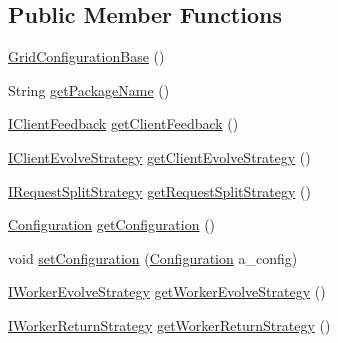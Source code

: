 \subsection*{Public Member Functions}
\begin{DoxyCompactItemize}
\item 
\hyperlink{classorg_1_1jgap_1_1distr_1_1grid_1_1_grid_configuration_base_a0e20a0cd43c2d69e7e8c1952958b073f}{Grid\-Configuration\-Base} ()
\item 
String \hyperlink{classorg_1_1jgap_1_1distr_1_1grid_1_1_grid_configuration_base_aba6035bb6328a8c2369e3159d9d11334}{get\-Package\-Name} ()
\item 
\hyperlink{interfaceorg_1_1jgap_1_1distr_1_1grid_1_1_i_client_feedback}{I\-Client\-Feedback} \hyperlink{classorg_1_1jgap_1_1distr_1_1grid_1_1_grid_configuration_base_ad41067896961d38b0acce894f731f61b}{get\-Client\-Feedback} ()
\item 
\hyperlink{interfaceorg_1_1jgap_1_1distr_1_1grid_1_1_i_client_evolve_strategy}{I\-Client\-Evolve\-Strategy} \hyperlink{classorg_1_1jgap_1_1distr_1_1grid_1_1_grid_configuration_base_a27ae917ad4de266b61ba27f0b86386cf}{get\-Client\-Evolve\-Strategy} ()
\item 
\hyperlink{interfaceorg_1_1jgap_1_1distr_1_1grid_1_1_i_request_split_strategy}{I\-Request\-Split\-Strategy} \hyperlink{classorg_1_1jgap_1_1distr_1_1grid_1_1_grid_configuration_base_a5cd317d525fd5ebc48c77eb519ea6852}{get\-Request\-Split\-Strategy} ()
\item 
\hyperlink{classorg_1_1jgap_1_1_configuration}{Configuration} \hyperlink{classorg_1_1jgap_1_1distr_1_1grid_1_1_grid_configuration_base_afef6d56bee396e8dec3fec2f7bcc6ef5}{get\-Configuration} ()
\item 
void \hyperlink{classorg_1_1jgap_1_1distr_1_1grid_1_1_grid_configuration_base_aa98a9608f716f4499a84bbf3d3a3ebb6}{set\-Configuration} (\hyperlink{classorg_1_1jgap_1_1_configuration}{Configuration} a\-\_\-config)
\item 
\hyperlink{interfaceorg_1_1jgap_1_1distr_1_1grid_1_1_i_worker_evolve_strategy}{I\-Worker\-Evolve\-Strategy} \hyperlink{classorg_1_1jgap_1_1distr_1_1grid_1_1_grid_configuration_base_a362ff61aa3ef6547e01dd237edb07661}{get\-Worker\-Evolve\-Strategy} ()
\item 
\hyperlink{interfaceorg_1_1jgap_1_1distr_1_1grid_1_1_i_worker_return_strategy}{I\-Worker\-Return\-Strategy} \hyperlink{classorg_1_1jgap_1_1distr_1_1grid_1_1_grid_configuration_base_a6d9a6e256cb6146a65091bf70331262f}{get\-Worker\-Return\-Strategy} ()
\item 

\end{DoxyCompactItemize}
